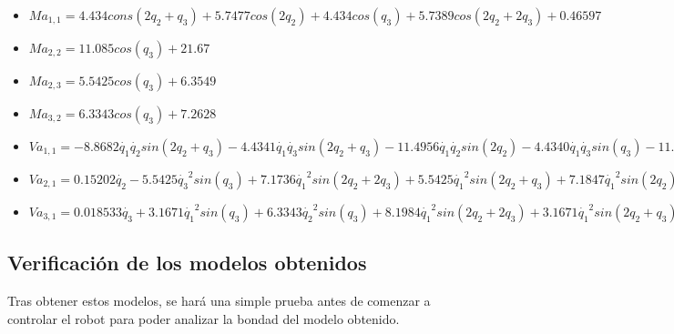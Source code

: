 \begin{itemize}
	
	\item $ Ma_{1,1}=4.434cons(2q_2 + q_3) + 5.7477cos(2q_2) + 4.434cos(q_3) + 5.7389cos(2q_2 + 2q_3) + 0.46597$ \\ \vspace{0.2cm}
	
	\item $ Ma_{2,2}= 11.085cos(q_3) + 21.67$ \\ \vspace{0.2cm}
	
	\item $ Ma_{2,3}=5.5425cos(q_3) + 6.3549$ \\ \vspace{0.2cm}
	
	\item $ Ma_{3,2}= 6.3343cos(q_3) + 7.2628 $ \\ \vspace{0.2cm}
	
	\item $ Va_{1,1}= -8.8682\dot{q_{1}}\dot{q_{2}}sin(2q_2 + q_3) - 4.4341\dot{q_{1}}\dot{q_{3}}sin(2q_2 + q_3) - 11.4956\dot{q_{1}}\dot{q_{2}}sin(2q_2)  - 4.4340\dot{q_{1}}\dot{q_{3}}sin(q_3) - 11.4779\dot{q_{1}}\dot{q_{2}}sin(2q_2 + 2q_3) - 11.4779\dot{q_{1}}\dot{q_{3}}sin(2q_2 + 2q_3) + 0.0363 $ \\ \vspace{0.2cm}
	
	\item $ Va_{2,1}= 0.15202\dot{q_{2}} - 5.5425\dot{q_{3}}^2sin(q_3) + 7.1736\dot{q_{1}}^2sin(2q_2 + 2q_3) + 5.5425\dot{q_{1}}^2sin(2q_2 + q_3) + 7.1847\dot{q_{1}}^2sin(2q_2) - 11.085\dot{q_{2}}\dot{q_{3}}sin(q_3)$ \\ \vspace{0.2cm}
	
	\item $ Va_{3,1}=  0.018533\dot{q_{3}} + 3.1671\dot{q_{1}}^{2}sin(q_3) + 6.3343\dot{q_{2}}^{2}sin(q_3) + 8.1984\dot{q_{1}}^{2}sin(2q_2 + 2q_3) + 3.1671\dot{q_{1}}^{2}sin(2q_2 + q_3)$
	
\end{itemize}

\newpage

\subsection{Verificación de los modelos obtenidos}

Tras obtener estos modelos, se hará una simple prueba antes de comenzar a controlar el robot para poder analizar la bondad del modelo obtenido.\\

